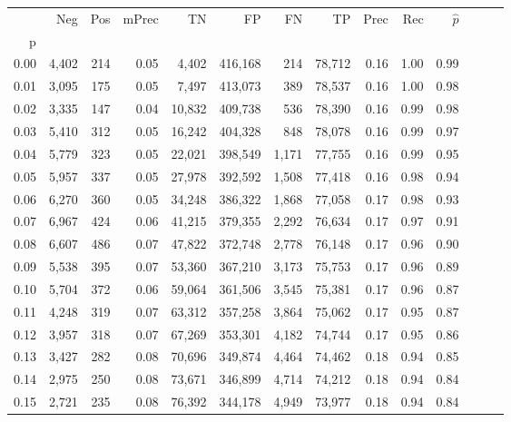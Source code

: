 \begin{tabular}{rrrrrrrrrrrrrr}
\toprule
{} &    Neg &    Pos & mPrec &       TN &       FP &      FN &      TP &  Prec &   Rec & $\hat{p}$ \\
p    &        &        &       &          &          &         &         &       &       &           \\
\midrule
0.00 &  4,402 &    214 &  0.05 &    4,402 &  416,168 &     214 &  78,712 &  0.16 &  1.00 &      0.99 \\
0.01 &  3,095 &    175 &  0.05 &    7,497 &  413,073 &     389 &  78,537 &  0.16 &  1.00 &      0.98 \\
0.02 &  3,335 &    147 &  0.04 &   10,832 &  409,738 &     536 &  78,390 &  0.16 &  0.99 &      0.98 \\
0.03 &  5,410 &    312 &  0.05 &   16,242 &  404,328 &     848 &  78,078 &  0.16 &  0.99 &      0.97 \\
0.04 &  5,779 &    323 &  0.05 &   22,021 &  398,549 &   1,171 &  77,755 &  0.16 &  0.99 &      0.95 \\
0.05 &  5,957 &    337 &  0.05 &   27,978 &  392,592 &   1,508 &  77,418 &  0.16 &  0.98 &      0.94 \\
0.06 &  6,270 &    360 &  0.05 &   34,248 &  386,322 &   1,868 &  77,058 &  0.17 &  0.98 &      0.93 \\
0.07 &  6,967 &    424 &  0.06 &   41,215 &  379,355 &   2,292 &  76,634 &  0.17 &  0.97 &      0.91 \\
0.08 &  6,607 &    486 &  0.07 &   47,822 &  372,748 &   2,778 &  76,148 &  0.17 &  0.96 &      0.90 \\
0.09 &  5,538 &    395 &  0.07 &   53,360 &  367,210 &   3,173 &  75,753 &  0.17 &  0.96 &      0.89 \\
0.10 &  5,704 &    372 &  0.06 &   59,064 &  361,506 &   3,545 &  75,381 &  0.17 &  0.96 &      0.87 \\
0.11 &  4,248 &    319 &  0.07 &   63,312 &  357,258 &   3,864 &  75,062 &  0.17 &  0.95 &      0.87 \\
0.12 &  3,957 &    318 &  0.07 &   67,269 &  353,301 &   4,182 &  74,744 &  0.17 &  0.95 &      0.86 \\
0.13 &  3,427 &    282 &  0.08 &   70,696 &  349,874 &   4,464 &  74,462 &  0.18 &  0.94 &      0.85 \\
0.14 &  2,975 &    250 &  0.08 &   73,671 &  346,899 &   4,714 &  74,212 &  0.18 &  0.94 &      0.84 \\
0.15 &  2,721 &    235 &  0.08 &   76,392 &  344,178 &   4,949 &  73,977 &  0.18 &  0.94 &      0.84 \\

\end{tabular}
